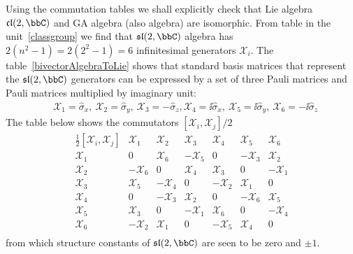 \begin{example}
Using the commutation tables we shall explicitly check that Lie
algebra $\mathfrak{cl}(2,\bbC)$ and GA algebra  (also
 algebra)  are isomorphic. From table in the
unit~\ref{classgroup} we find that $\mathfrak{sl}(2,\bbC)$ algebra
has $2(n^2-1)=2(2^2-1)=6$ infinitesimal generators
$\mathcal{X}_i$. The table~\ref{bivectorAlgebraToLie} shows that
standard basis matrices that represent the $\mathfrak{sl}(2,\bbC)$
generators can be expressed by a set of three Pauli matrices and
Pauli matrices multiplied by imaginary unit:
\[\begin{split}
&\mathcal{X}_1=\hat{\sigma}_x,\ \mathcal{X}_2 =\hat{\sigma}_y,\
\mathcal{X}_3=-\hat{\sigma}_z, \mathcal{X}_4=\ii\hat{\sigma}_x,\
\mathcal{X}_5=\ii\hat{\sigma}_y,\ \mathcal{X}_6=-\ii\hat{\sigma}_z
\end{split}\]
The table below shows the commutators
$[\mathcal{X}_i,\mathcal{X}_j]/2$
\[\begin{array}{c|cccccc}
\tfrac{1}{2}[\mathcal{X}_i,\mathcal{X}_j]&\mathcal{X}_1&\mathcal{X}_2&\mathcal{X}_3&\mathcal{X}_4&\mathcal{X}_5&\mathcal{X}_6\\
\hline
\mathcal{X}_1&0&\mathcal{X}_6&-\mathcal{X}_5&0&-\mathcal{X}_3&\mathcal{X}_2\\
\mathcal{X}_2&-\mathcal{X}_6&0&\mathcal{X}_4&\mathcal{X}_3&0&-\mathcal{X}_1\\
\mathcal{X}_3&\mathcal{X}_5&-\mathcal{X}_4&0&-\mathcal{X}_2&\mathcal{X}_1&0\\
\mathcal{X}_4&0&-\mathcal{X}_3&\mathcal{X}_2&0&-\mathcal{X}_6&\mathcal{X}_5\\
\mathcal{X}_5&\mathcal{X}_3&0&-\mathcal{X}_1&\mathcal{X}_6&0&-\mathcal{X}_4\\
\mathcal{X}_6&-\mathcal{X}_2&\mathcal{X}_1&0&-\mathcal{X}_5&\mathcal{X}_4&0\\
\end{array}\]
from which structure constants of $\mathfrak{sl}(2,\bbC)$ are seen
to be zero and $\pm 1$.


\end{example}
